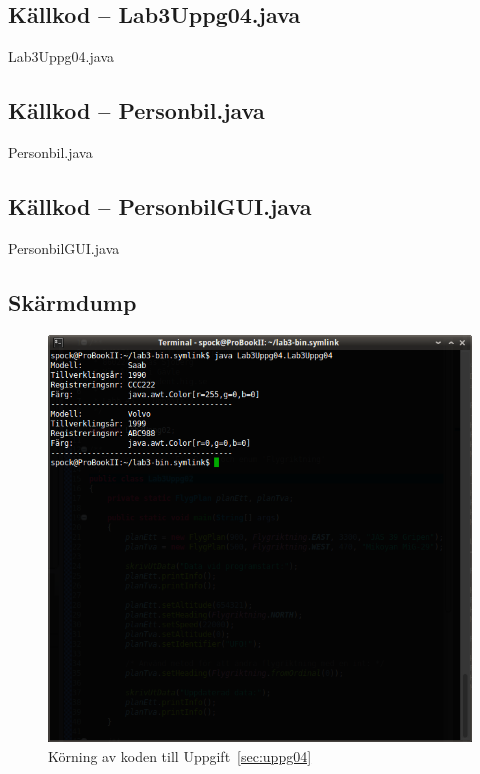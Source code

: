 \subsection{Källkod -- Lab3Uppg04.java}
\caption{Lab3Uppg04.java}
\label{src:uppg04}

\subsection{Källkod -- Personbil.java}
\caption{Personbil.java}
\label{src:personbil}

\subsection{Källkod -- PersonbilGUI.java}
\caption{PersonbilGUI.java}
\label{src:personbilgui}


\subsection{Skärmdump}
\begin{figure}[htbp]
    \centering
        \includegraphics[width=\linewidth]{img/04.png}
    \caption{Körning av koden till Uppgift~\ref{sec:uppg04}}
    \label{fig:uppg04-screenshot-cli}
\end{figure}


